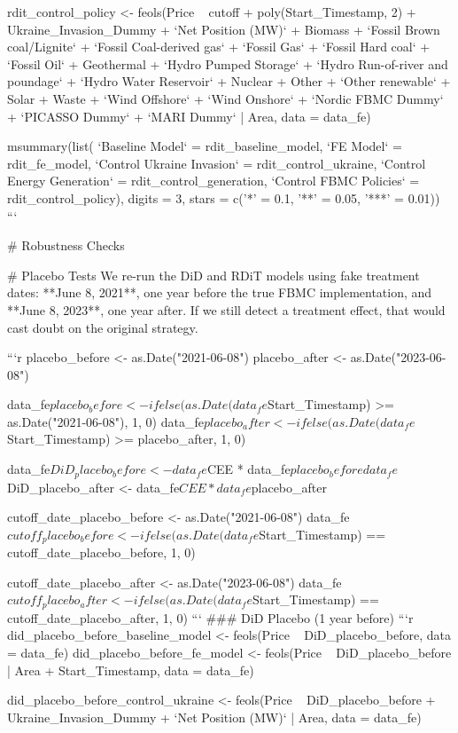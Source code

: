 rdit_control_policy <- feols(Price ~ cutoff + poly(Start_Timestamp, 2) + Ukraine_Invasion_Dummy + `Net Position (MW)` + Biomass + `Fossil Brown coal/Lignite` + `Fossil Coal-derived gas` + `Fossil Gas` + `Fossil Hard coal` + `Fossil Oil` + Geothermal + `Hydro Pumped Storage` + `Hydro Run-of-river and poundage` + `Hydro Water Reservoir` + Nuclear + Other + `Other renewable` + Solar + Waste + `Wind Offshore` + `Wind Onshore` + `Nordic FBMC Dummy` + `PICASSO Dummy` + `MARI Dummy` | Area, data = data_fe)

msummary(list(
    `Baseline Model` = rdit_baseline_model,
    `FE Model` = rdit_fe_model,
    `Control Ukraine Invasion` = rdit_control_ukraine,
    `Control Energy Generation` = rdit_control_generation,
    `Control FBMC Policies` = rdit_control_policy),
  digits = 3,
  stars = c('*' = 0.1, '**' = 0.05, '***' = 0.01))
```

# Robustness Checks

# Placebo Tests
We re-run the DiD and RDiT models using fake treatment dates: **June 8, 2021**, one year before the true FBMC implementation, and **June 8, 2023**, one year after. If we still detect a treatment effect, that would cast doubt on the original strategy.

```{r}
placebo_before <- as.Date("2021-06-08")
placebo_after <- as.Date("2023-06-08")

data_fe$placebo_before <- ifelse(as.Date(data_fe$Start_Timestamp) >= as.Date("2021-06-08"), 1, 0)
data_fe$placebo_after <- ifelse(as.Date(data_fe$Start_Timestamp) >= placebo_after, 1, 0)

data_fe$DiD_placebo_before <- data_fe$CEE * data_fe$placebo_before
data_fe$DiD_placebo_after <- data_fe$CEE * data_fe$placebo_after

cutoff_date_placebo_before <- as.Date("2021-06-08")
data_fe$cutoff_placebo_before <- ifelse(as.Date(data_fe$Start_Timestamp) == cutoff_date_placebo_before, 1, 0)

cutoff_date_placebo_after <- as.Date("2023-06-08")
data_fe$cutoff_placebo_after <- ifelse(as.Date(data_fe$Start_Timestamp) == cutoff_date_placebo_after, 1, 0)
```
### DiD Placebo (1 year before)
```{r}
did_placebo_before_baseline_model <- feols(Price ~ DiD_placebo_before, data = data_fe)
did_placebo_before_fe_model <- feols(Price ~ DiD_placebo_before | Area + Start_Timestamp, data = data_fe)

did_placebo_before_control_ukraine <- feols(Price ~ DiD_placebo_before + Ukraine_Invasion_Dummy + `Net Position (MW)` | Area, data = data_fe)

